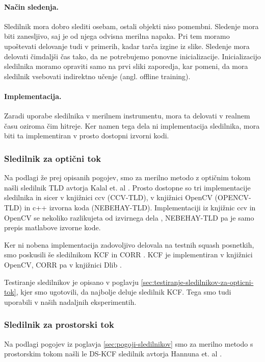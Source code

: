 \paragraph{Način sledenja.} Sledilnik mora dobro slediti osebam, ostali objekti niso pomembni. Sledenje mora biti zanesljivo, saj je od njega odvisna merilna napaka. Pri tem moramo upoštevati delovanje tudi v primerih, kadar tarča izgine iz slike. Sledenje mora delovati čimdaljši čas tako, da ne potrebujemo ponovne inicializacije. Inicializacijo sledilnika moramo opraviti samo na prvi sliki zaporedja, kar pomeni, da mora sledilnik vsebovati indirektno učenje (angl. offline training).

\paragraph{Implementacija.} Zaradi uporabe sledilnika v merilnem instrumentu, mora ta delovati v realnem času oziroma čim hitreje. Ker namen tega dela ni implementacija sledilnika, mora biti ta implementiran v prosto dostopni izvorni kodi. 


\subsubsection{Sledilnik za optični tok}
Na podlagi že prej opisanih pogojev, smo za merilno metodo z optičnim tokom našli sledilnik TLD avtorja Kalal et. al \cite{kalal2012tracking}. Prosto dostopne so tri implementacije sledilnika in sicer v knjižnici ccv (CCV-TLD), v knjižnici OpenCV (OPENCV-TLD) in c++ izvorna koda (NEBEHAY-TLD). Implementaciji iz knjižnic ccv in OpenCV se nekoliko razlikujeta od izvirnega dela \cite{kalal2012tracking}, NEBEHAY-TLD pa je samo prepis matlabove izvorne kode. 

Ker ni nobena implementacija zadovoljivo delovala na testnih squash posnetkih, smo poskusili še sledilnikom KCF \cite{danelljan2014adaptive} in CORR \cite{danelljan2014accurate}. KCF je implementiran v knjižnici OpenCV, CORR pa v knjižnici Dlib \cite{king2009dlib}.

Testiranje sledilnikov je opisano v poglavju \ref{sec:testiranje-sledilnikov-za-opticni-tok}, kjer smo ugotovili, da najbolje deluje sledilnik KCF. Tega smo tudi uporabili v naših nadaljnih eksperimentih.

\subsubsection{Sledilnik za prostorski tok}
Na podlagi pogojev iz poglavja \ref{sec:pogoji-sledilnikov} smo za merilno metodo s prostorskim tokom našli le DS-KCF sledilnik avtorja Hannuna et. al \cite{hannuna2016ds}. 

